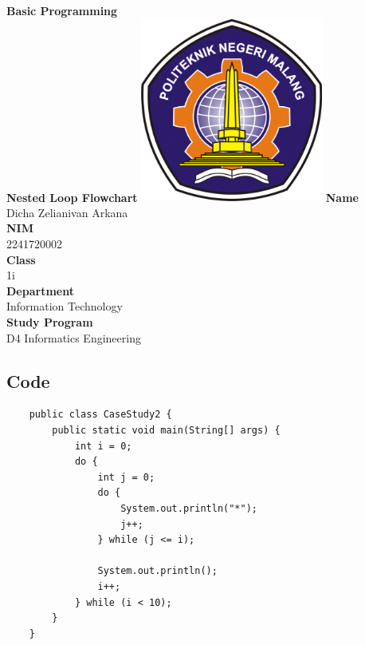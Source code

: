 \documentclass[12pt,titlepage]{article}
\newcommand{\vSubject}{Basic Programming}
\newcommand{\vSubtitle}{Nested Loop Flowchart}
\newcommand{\vName}{Dicha Zelianivan Arkana}
\newcommand{\vNIM}{2241720002}
\newcommand{\vClass}{1i}
\newcommand{\vDepartment}{Information Technology}
\newcommand{\vStudyProgram}{D4 Informatics Engineering}
\begin{document}
\begin{titlepage}
    \centering
    \vfill
    {\bfseries\LARGE
        \vSubject\\
        \vskip0.25cm
        \vSubtitle
    }
    \vfill
    \includegraphics[width=6cm]{images/polinema-logo.png}
    \vfill
    {
        \textbf{Name}\\
        \vName\\
        \vskip0.5cm
        \textbf{NIM}\\
        \vNIM\\
        \vskip0.5cm
        \textbf{Class}\\
        \vClass\\
        \vskip0.5cm
        \textbf{Department}\\
        \vDepartment\\
        \vskip0.5cm
        \textbf{Study Program}\\
        \vStudyProgram
    }
\end{titlepage}

\subsection*{Code}
\begin{verbatim}
    public class CaseStudy2 {
        public static void main(String[] args) {
            int i = 0;
            do {
                int j = 0;
                do {
                    System.out.println("*");
                    j++;
                } while (j <= i);

                System.out.println();
                i++;
            } while (i < 10);
        }
    }
\end{verbatim}
\end{document}

